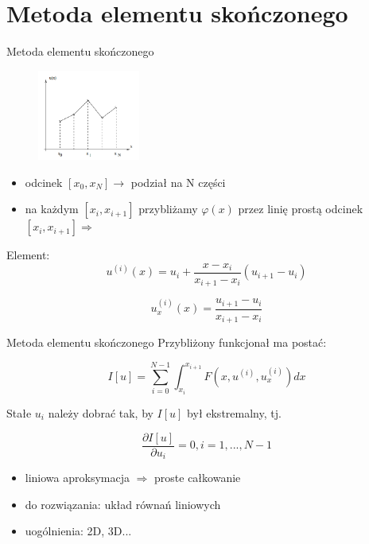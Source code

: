 \section{Metoda elementu skończonego}

	\begin{frame}{Metoda elementu skończonego}
		\begin{figure}
			\includegraphics[width=0.3\textwidth]{img/19/fin_elem_method}
		\end{figure}
		
		\begin{itemize}
			\item odcinek $[x_0, x_N] \rightarrow$ podział na N części
			\item na każdym $[x_i, x_{i+1}]$ przybliżamy $\varphi(x)$ przez linię prostą odcinek $[x_i, x_{i+1}] \Rightarrow$
		\end{itemize}
		Element:
		$$
		u^{(i)}(x) = u_i + \frac{x - x_i}{x_{i+1} - x_i}(u_{i+1} - u_i)
		$$
		
		$$
		u_x^{(i)}(x) = \frac{u_{i+1} - u_i}{x_{i+1} - x_i}
		$$
		
	\end{frame}
	
	
	\begin{frame}{Metoda elementu skończonego}
		Przybliżony funkcjonał ma postać:
		
		$$
		I[u] = \sum_{i=0}^{N-1} \int_{x_i}^{x_{i+1}} F(x, u^{(i)}, u_x^{(i)} ) dx
		$$
		
		Stałe $u_i$ należy dobrać tak, by $I[u]$ był ekstremalny, tj.
		
		$$
		\frac{\partial I[u]}{\partial u_i} = 0, i = 1, ... , N-1
		$$
		
		
		\begin{itemize}
			\item liniowa aproksymacja $\Rightarrow$ proste całkowanie
			\item do rozwiązania: układ równań liniowych
			\item uogólnienia: 2D, 3D...
		\end{itemize}
		
	\end{frame}




